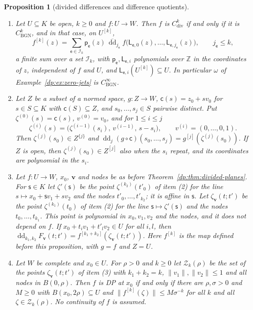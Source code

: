 \documentclass[11pt]{amsart}
\newtheorem{proposition}[theorem]{Proposition}
\theoremstyle{definition}
\theoremstyle{remark}
\numberwithin{equation}{section}
\newcommand{\Z}{\mathbb Z}
\newcommand{\norm}[1]{\lVert #1\rVert}
\theoremstyle{plain}
\theoremstyle{definition}
\theoremstyle{plain}
\begin{document}
\begin{proposition}[divided differences and difference quotients]\label{dp:prop:div-bgn}
\leavevmode
\begin{enumerate}
\item Let $U\subseteq K$ be open, $k\ge0$ and $f\colon U\to W$. Then $f$ is $C^k_{\mathrm{div}}$ if and only if it is $C^k_{\mathrm{BGN}}$, and in that case, on $U^{[k]}$,
\begin{equation}\label{dp:sq:explicit}
 f^{[k]}(z)=\sum_{\mathsf e\in\mathcal I_k}\mathsf p_{\mathsf e}(z)\,\overline{\operatorname{dd}}_{j_{\mathsf e}}f\bigl(\mathsf L_{\mathsf e,0}(z),\dots,\mathsf L_{\mathsf e,j_{\mathsf e}}(z)\bigr),\qquad j_{\mathsf e}\le k,
\end{equation}
a finite sum over a set $\mathcal I_k$, with $\mathsf p_{\mathsf e},\mathsf L_{\mathsf e,i}$ polynomials over $\Z$ in the coordinates of $z$, independent of $f$ and $U$, and $\mathsf L_{\mathsf e,i}(U^{[k]})\subseteq U$. In particular $\omega$ of Example~\textup{\ref{dp:ex:zero-jets}} is $C^\infty_{\mathrm{BGN}}$.
\item Let $Z$ be a subset of a normed space, $g\colon Z\to W$, $\mathsf c(s)=z_0+sv_0$ for $s\in S\subseteq K$ with $\mathsf c(S)\subseteq Z$, and $s_0,\dots,s_j\in S$ pairwise distinct. Put $\zeta^{(0)}(s)=\mathsf c(s)$, $v^{(0)}=v_0$, and for $1\le i\le j$
\[
 \zeta^{(i)}(s)=\bigl(\zeta^{(i-1)}(s_i),\,v^{(i-1)},\,s-s_i\bigr),\qquad v^{(i)}=(0,\dots,0,1).
\]
Then $\zeta^{(j)}(s_0)\in Z^{\{j\}}$ and $\operatorname{dd}_j(g\circ\mathsf c)(s_0,\dots,s_j)=g^{[j]}(\zeta^{(j)}(s_0))$. If $Z$ is open, then $\zeta^{(j)}(s_0)\in Z^{[j]}$ also when the $s_i$ repeat, and its coordinates are polynomial in the $s_i$.
\item Let $f\colon U\to W$, $x_0$, $\mathbf v$ and nodes be as before Theorem~\textup{\ref{dp:thm:divided-planes}}. For $\mathsf s\in K$ let $\zeta'(\mathsf s)$ be the point $\zeta^{(k_2)}(t'_0)$ of item \textup{(2)} for the line $s\mapsto x_0+\mathsf sv_1+sv_2$ and the nodes $t'_0,\dots,t'_{k_2}$; it is affine in $\mathsf s$. Let $\zeta_{\mathbf v}(t;t')$ be the point $\zeta^{(k_1)}(t_0)$ of item \textup{(2)} for the line $\mathsf s\mapsto\zeta'(\mathsf s)$ and the nodes $t_0,\dots,t_{k_1}$. This point is polynomial in $x_0,v_1,v_2$ and the nodes, and it does not depend on $f$. If $x_0+t_iv_1+t'_lv_2\in U$ for all $i,l$, then $\operatorname{dd}_{k_1,k_2}F_{\mathbf v}(t;t')=f^{[k_1+k_2]}(\zeta_{\mathbf v}(t;t'))$. Here $f^{[k]}$ is the map defined before this proposition, with $g=f$ and $Z=U$.
\item Let $W$ be complete and $x_0\in U$. For $\rho>0$ and $k\ge0$ let $\mathcal Z_k(\rho)$ be the set of the points $\zeta_{\mathbf v}(t;t')$ of item \textup{(3)} with $k_1+k_2=k$, $\norm{v_1},\norm{v_2}\le1$ and all nodes in $B(0,\rho)$. Then $f$ is DP at $x_0$ if and only if there are $\rho,\sigma>0$ and $M\ge0$ with $B(x_0,2\rho)\subseteq U$ and $\norm{f^{[k]}(\zeta)}\le M\sigma^{-k}$ for all $k$ and all $\zeta\in\mathcal Z_k(\rho)$. No continuity of $f$ is assumed.
\end{enumerate}
\end{proposition}
\end{document}
